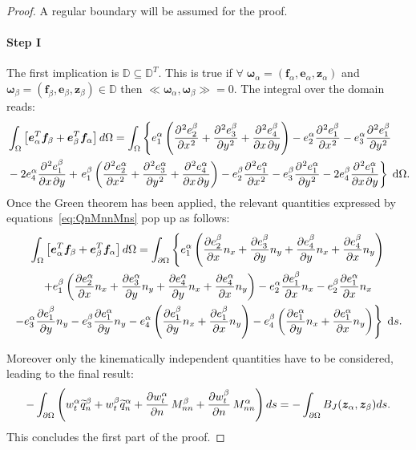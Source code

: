 \documentclass[preprint,12pt]{elsarticle}
\begin{document}
\begin{proof}
	A regular boundary will be assumed for the proof.
	\paragraph{\textbf{Step I}} 
	The first implication is $\mathbb{D} \subseteq \mathbb{D}^T$. This is true if $ \forall \;\bm\omega_\alpha = (\bm{f}_\alpha, \bm{e}_\alpha, \bm{z}_\alpha)$ and $\bm\omega_\beta = (\bm{f}_\beta, \bm{e}_\beta, \bm{z}_\beta) \in \mathbb{D}$ then $\ll \bm\omega_\alpha, \bm\omega_\beta \gg = 0$. The integral over the domain reads:
	\begin{align*}
	&\int_{\Omega}  \left[ \bm{e}_\alpha^T \bm{f}_\beta + \bm{e}_\beta^T \bm{f}_\alpha \right] d\Omega
	= \int_{\Omega} \left\{ e_1^\alpha \left( \diffp[2]{e_2^\beta}{x} + \diffp[2]{e_3^\beta}{y} + \diffp{e_4^\beta}{x,y} \right) - e_2^\alpha \diffp[2]{e_1^\beta}{x} -e_3^\alpha \diffp[2]{e_1^\beta}{y} \right.\\ 
	&  - 2 e_4^\alpha \diffp{e_1^\beta}{x,y} + 
	\left. e_1^\beta \left( \diffp[2]{e_2^\alpha}{x} + \diffp[2]{e_3^\alpha}{y} + \diffp{e_4^\alpha}{x,y} \right) - e_2^\beta \diffp[2]{e_1^\alpha}{x} -e_3^\beta \diffp[2]{e_1^\alpha}{y} - 2 e_4^\beta \diffp{e_1^\alpha}{x,y} \right\} \d{\Omega}. \\
	\end{align*}
	Once the Green theorem has been applied,  the relevant quantities expressed by equations~\eqref{eq:QnMnnMns} pop up as follows:
	\begin{multline}
	\int_{\Omega}  \left[ \bm{e}_\alpha^T \bm{f}_\beta + \bm{e}_\beta^T \bm{f}_\alpha \right] d\Omega = \int_{\partial \Omega}  \left\{ e_1^\alpha \left( \diffp{e_2^\beta}{x} n_x + \diffp{e_3^\beta}{y} n_y +\diffp{e_4^\beta}{y} n_x + \diffp{e_4^\beta}{x} n_y \right) \right. \\
	\left.   + e_1^\beta \left( \diffp{e_2^\alpha}{x} n_x + \diffp{e_3^\alpha}{y} n_y +\diffp{e_4^\alpha}{y} n_x + \diffp{e_4^\alpha}{x} n_y \right) - e_2^\alpha \diffp{e_1^\beta}{x} n_x - e_2^\beta \diffp{e_1^\alpha}{x} n_x   \right.\\
	\left. - e_3^\alpha \diffp{e_1^\beta}{y} n_y  - e_3^\beta \diffp{e_1^\alpha}{y} n_y  - e_4^\alpha \left( \diffp{e_1^\beta}{y} n_x + \diffp{e_1^\beta}{x} n_y \right) - e_4^\beta \left( \diffp{e_1^\alpha}{y} n_x + \diffp{e_1^\alpha}{x} n_y \right) \right\} \d{s}. 
	\end{multline}
	
	Moreover only the kinematically independent quantities have to be considered, leading to the final result:
	\begin{equation}
	- \int_{\partial \Omega} \left( w_t^\alpha \widetilde{q}_n^\beta + w_t^\beta \widetilde{q}_n^\alpha + \diffp{w_t^\alpha}{n} \, M_{nn}^\beta + \diffp{w_t^\beta}{n} \, M_{nn}^\alpha \right) ds =  - \int_{\partial \Omega}  B_J(\bm{z}_\alpha, \bm{z}_\beta) ds.
	\end{equation}		
	This concludes the first part of the proof.

\end{proof}
\end{document}
